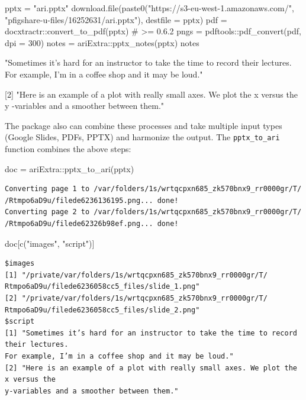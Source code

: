 \begin{Schunk}
\begin{Sinput}
pptx = "ari.pptx"
download.file(paste0("https://s3-eu-west-1.amazonaws.com/", 
                     "pfigshare-u-files/16252631/ari.pptx"),
              destfile = pptx)
pdf = docxtractr::convert_to_pdf(pptx) # >= 0.6.2 
pngs = pdftools::pdf_convert(pdf, dpi = 300)
notes = ariExtra::pptx_notes(pptx)
notes
\end{Sinput}
\end{Schunk}

\begin{Schunk}
\begin{Soutput}
[1] "Sometimes it’s hard for an instructor to take the time to record their lectures.
For example, I’m in a coffee shop and it may be loud."

[2] "Here is an example of a plot with really small axes.  We plot the x versus the y
-variables and a smoother between them."
\end{Soutput}
\end{Schunk}

The  package also can combine these processes and take
multiple input types (Google Slides, PDFs, PPTX) and harmonize the
output. The \texttt{pptx\_to\_ari} function combines the above steps:

\begin{Schunk}
\begin{Sinput}
doc = ariExtra::pptx_to_ari(pptx)
\end{Sinput}
\end{Schunk}

\begin{verbatim}
Converting page 1 to /var/folders/1s/wrtqcpxn685_zk570bnx9_rr0000gr/T/
/Rtmpo6aD9u/filede6236136195.png... done!
Converting page 2 to /var/folders/1s/wrtqcpxn685_zk570bnx9_rr0000gr/T/
/Rtmpo6aD9u/filede62326b98ef.png... done!
\end{verbatim}

\begin{Schunk}
\begin{Sinput}
doc[c("images", "script")]
\end{Sinput}
\end{Schunk}

\begin{verbatim}
$images
[1] "/private/var/folders/1s/wrtqcpxn685_zk570bnx9_rr0000gr/T/
Rtmpo6aD9u/filede6236058cc5_files/slide_1.png"
[2] "/private/var/folders/1s/wrtqcpxn685_zk570bnx9_rr0000gr/T/
Rtmpo6aD9u/filede6236058cc5_files/slide_2.png"
$script
[1] "Sometimes it’s hard for an instructor to take the time to record their lectures. 
For example, I’m in a coffee shop and it may be loud."
[2] "Here is an example of a plot with really small axes. We plot the x versus the 
y-variables and a smoother between them."
\end{verbatim}

